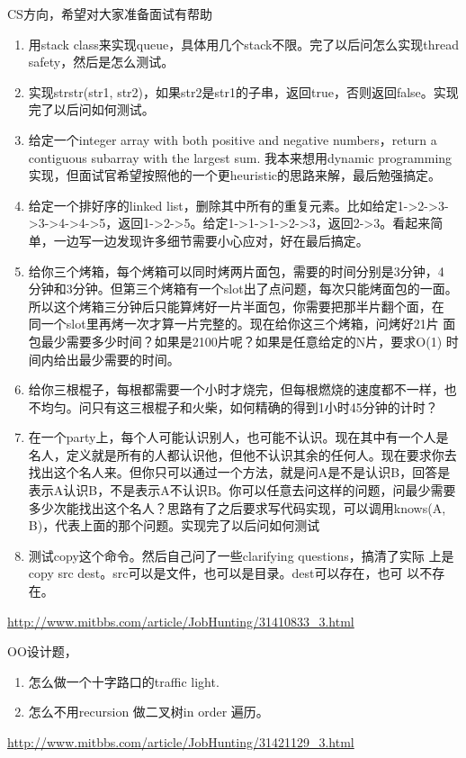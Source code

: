 \documentclass[12pt]{book}
\begin{document}
CS方向，希望对大家准备面试有帮助
\begin{enumerate}
\item 用stack class来实现queue，具体用几个stack不限。完了以后问怎么实现thread safety，然后是怎么测试。
\item 实现strstr(str1, str2)，如果str2是str1的子串，返回true，否则返回false。实现完了以后问如何测试。
\item 给定一个integer array with both positive and negative numbers，return a contiguous subarray with the largest sum. 我本来想用dynamic programming实现，但面试官希望按照他的一个更heuristic的思路来解，最后勉强搞定。
\item 给定一个排好序的linked list，删除其中所有的重复元素。比如给定1->2->3->3->4->4->5，返回1->2->5。给定1->1->1->2->3，返回2->3。看起来简单，一边写一边发现许多细节需要小心应对，好在最后搞定。
\item 给你三个烤箱，每个烤箱可以同时烤两片面包，需要的时间分别是3分钟，4
分钟和3分钟。但第三个烤箱有一个slot出了点问题，每次只能烤面包的一面。
所以这个烤箱三分钟后只能算烤好一片半面包，你需要把那半片翻个面，在
同一个slot里再烤一次才算一片完整的。现在给你这三个烤箱，问烤好21片
面包最少需要多少时间？如果是2100片呢？如果是任意给定的N片，要求O(1)
时间内给出最少需要的时间。
\item 给你三根棍子，每根都需要一个小时才烧完，但每根燃烧的速度都不一样，也不均匀。问只有这三根棍子和火柴，如何精确的得到1小时45分钟的计时？
\item 在一个party上，每个人可能认识别人，也可能不认识。现在其中有一个人是名人，定义就是所有的人都认识他，但他不认识其余的任何人。现在要求你去找出这个名人来。但你只可以通过一个方法，就是问A是不是认识B，回答是表示A认识B，不是表示A不认识B。你可以任意去问这样的问题，问最少需要多少次能找出这个名人？思路有了之后要求写代码实现，可以调用knows(A, B)，代表上面的那个问题。实现完了以后问如何测试
\item 测试copy这个命令。然后自己问了一些clarifying questions，搞清了实际
上是copy src dest。src可以是文件，也可以是目录。dest可以存在，也可
以不存在。
\end{enumerate}
\url{http://www.mitbbs.com/article/JobHunting/31410833_3.html}

OO设计题，
\begin{enumerate}
\item 怎么做一个十字路口的traffic light.
\item 怎么不用recursion 做二叉树in order 遍历。
\end{enumerate}
\url{http://www.mitbbs.com/article/JobHunting/31421129_3.html}
\end{document}
